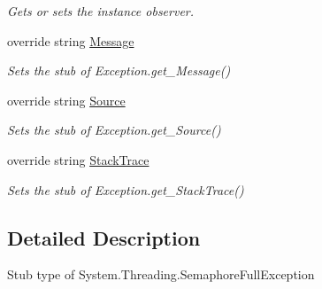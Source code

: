 \begin{DoxyCompactItemize}
\begin{DoxyCompactList}\small\item\em Gets or sets the instance observer.\end{DoxyCompactList}\item 
override string \hyperlink{class_system_1_1_threading_1_1_fakes_1_1_stub_semaphore_full_exception_ad052db53e037ed4fed993a887bb0f79a}{Message}
\begin{DoxyCompactList}\small\item\em Sets the stub of Exception.\-get\-\_\-\-Message()\end{DoxyCompactList}\item 
override string \hyperlink{class_system_1_1_threading_1_1_fakes_1_1_stub_semaphore_full_exception_a978ea92420abe7c0dcc7cda2dcbd737e}{Source}
\begin{DoxyCompactList}\small\item\em Sets the stub of Exception.\-get\-\_\-\-Source()\end{DoxyCompactList}\item 
override string \hyperlink{class_system_1_1_threading_1_1_fakes_1_1_stub_semaphore_full_exception_ae41b91a94c8f435e1fa1c8e986c1e0d6}{Stack\-Trace}
\begin{DoxyCompactList}\small\item\em Sets the stub of Exception.\-get\-\_\-\-Stack\-Trace()\end{DoxyCompactList}\end{DoxyCompactItemize}


\subsection{Detailed Description}
Stub type of System.\-Threading.\-Semaphore\-Full\-Exception



